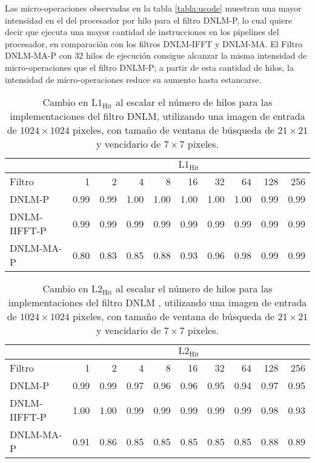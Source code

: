 Las micro-operaciones observadas en la tabla \ref{tabla:ucode} muestran una mayor intensidad en el  del procesador por hilo para el filtro DNLM-P, lo cual quiere decir que ejecuta una mayor cantidad de instrucciones en los pipelines del procesador, en comparaci\'on con los filtros DNLM-IFFT y DNLM-MA. El Filtro DNLM-MA-P  con 32 hilos de ejecuci\'on consigue alcanzar la misma intensidad de micro-operaciones que el filtro DNLM-P; a partir de esta cantidad de hilos, la intensidad de micro-operaciones reduce su aumento hasta estancarse. 

\begin{table}[htb]
\centering
\caption[Cambio en la raz\'on de aciertos de lectura en cach\'e L1 al escalar el n\'umero de hilos]{Cambio en  $\text{L1}_{\text{Hit}}$ al escalar el n\'umero de hilos para las implementaciones del filtro DNLM, utilizando una imagen de entrada de $1024 \times 1024$ pixeles, con tama\~no de ventana de búsqueda de $21 \times 21$ y vencidario de $7 \times 7$ pixeles. \label{tabla:l1_hit}}
\begin{tabular}{lrrrrrrrrr}
& \multicolumn{9}{c}{$\text{L1}_{\text{Hit}}$} \tabularnewline
\hline
 Filtro & 1 & 2 & 4 & 8 & 16 & 32 & 64 & 128 & 256 \tabularnewline
\hline
DNLM-P & 0.99 & 0.99 & 1.00 & 1.00 & 1.00 & 1.00 & 1.00 & 0.99 & 0.99 \tabularnewline
DNLM-IIFFT-P & 0.99 & 0.99 & 0.99 & 0.99 & 0.99 & 0.99 & 0.99 & 0.99 & 0.99 \tabularnewline
DNLM-MA-P & 0.80 & 0.83 & 0.85 & 0.88 & 0.93 & 0.96 & 0.98 & 0.99 & 0.99 \tabularnewline
\end{tabular}
\end{table}


\begin{table}[htb]
\centering
\caption[Cambio en la raz\'on de aciertos de lectura en cach\'e L2 al escalar el n\'umero de hilos]{Cambio en  $\text{L2}_{\text{Hit}}$ al escalar el n\'umero de hilos para las implementaciones del filtro DNLM , utilizando una imagen de entrada de $1024 \times 1024$ pixeles, con tama\~no de ventana de búsqueda de $21 \times 21$ y vencidario de $7 \times 7$ pixeles. \label{tabla:l2_hit}}
\begin{tabular}{lrrrrrrrrr}
& \multicolumn{9}{c}{$\text{L2}_{\text{Hit}}$} \tabularnewline
\hline
 Filtro & 1 & 2 & 4 & 8 & 16 & 32 & 64 & 128 & 256 \tabularnewline
\hline
DNLM-P & 0.99 & 0.99 & 0.97 & 0.96 & 0.96 & 0.95 & 0.94 & 0.97 & 0.95 \tabularnewline
DNLM-IIFFT-P & 1.00 & 1.00 & 0.99 & 0.99 & 0.99 & 0.99 & 0.99 & 0.98 & 0.93 \tabularnewline
DNLM-MA-P & 0.91 & 0.86 & 0.85 & 0.85 & 0.85 & 0.85 & 0.85 & 0.88 & 0.89 \tabularnewline
\end{tabular}
\end{table}


